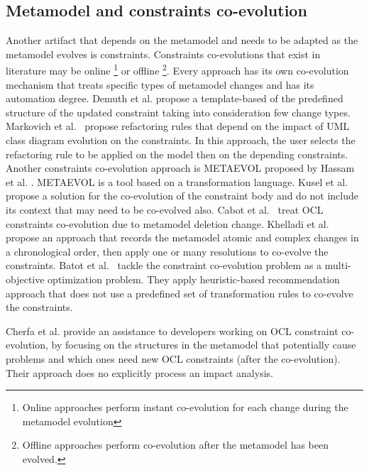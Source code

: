  

\subsection{Metamodel and constraints co-evolution}
Another artifact that depends on the metamodel and needs to be adapted as the metamodel evolves is constraints.
 Constraints co-evolutions that exist in literature may be online \footnote{Online approaches perform instant co-evolution for each change during the metamodel evolution} or offline \footnote{Offline approaches perform co-evolution after the metamodel has been evolved.}. Every approach has its own co-evolution mechanism that treats specific types of metamodel changes and has its automation degree. Demuth et al. \cite{10.1007/978-3-642-41533-3_18} propose a template-based of the predefined structure of the updated constraint taking into consideration few change types. Markovich et al.~\cite{markovic2008refactoring} propose refactoring rules that depend on the impact of UML class diagram evolution on the constraints. In this approach, the user selects the refactoring rule to be applied on the model then on the depending constraints. Another constraints co-evolution approach is METAEVOL proposed by Hassam et al. \cite{hassam2011assistance}. METAEVOL is a tool based on a transformation language. Kusel et al.~\cite{kusel2014systematic} propose a solution for the co-evolution of the constraint body and do not include its context that may need to be co-evolved also.
 Cabot et al.~\cite{cabot2004automatic} treat OCL constraints co-evolution due to metamodel deletion change. Khelladi et al.~\cite{khelladi2017semi} propose an approach that records the metamodel atomic and complex changes in a chronological order, then apply one or many resolutions to co-evolve the constraints. Batot et al.~\cite{8101267} tackle the constraint co-evolution problem as a multi-objective optimization problem. They apply heuristic-based recommendation approach that does not use a predefined set of transformation rules to co-evolve the constraints.
 
 
 Cherfa et al. \cite{cherfa2021identifying} provide an assistance to developers working on OCL constraint co-evolution, by focusing on the structures in the metamodel that potentially cause problems and which ones need new OCL constraints (after the co-evolution). Their approach does no explicitly process an impact analysis.%
 
